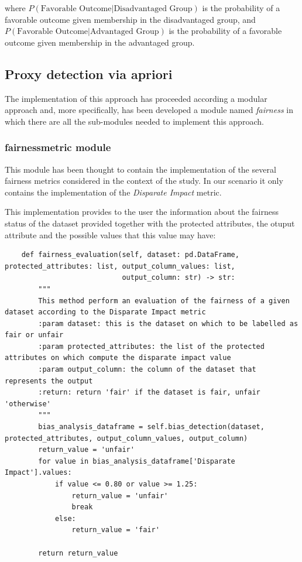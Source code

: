 \documentclass[12pt,a4paper,openright,twoside]{book}
\begin{document}
where $P(\text{Favorable Outcome} | \text{Disadvantaged Group})$ is the probability of a favorable outcome given membership in the disadvantaged group, and  
 $P(\text{Favorable Outcome} | \text{Advantaged Group})$ is the probability of a favorable outcome given membership in the advantaged group.
\subsection{Proxy detection via apriori}
The implementation of this approach has proceeded according a modular approach and, more specifically, has been developed a module named \emph{fairness} in which there are all the sub-modules needed to implement this approach.
\subsubsection{fairness\textunderscore metric module}
This module has been thought to contain the implementation of the several fairness metrics considered in the context of the study. In our scenario it only contains the implementation of the \emph{Disparate Impact} metric. 

This implementation provides to the user the information about the fairness status of the dataset provided together with the protected attributes, the otuput attribute and the possible values that this value may have: 

\begin{lstlisting}
    def fairness_evaluation(self, dataset: pd.DataFrame, protected_attributes: list, output_column_values: list,
                            output_column: str) -> str:
        """
        This method perform an evaluation of the fairness of a given dataset according to the Disparate Impact metric
        :param dataset: this is the dataset on which to be labelled as fair or unfair
        :param protected_attributes: the list of the protected attributes on which compute the disparate impact value
        :param output_column: the column of the dataset that represents the output
        :return: return 'fair' if the dataset is fair, unfair 'otherwise'
        """
        bias_analysis_dataframe = self.bias_detection(dataset, protected_attributes, output_column_values, output_column)
        return_value = 'unfair'
        for value in bias_analysis_dataframe['Disparate Impact'].values:
            if value <= 0.80 or value >= 1.25:
                return_value = 'unfair'
                break
            else:
                return_value = 'fair'

        return return_value
\end{lstlisting}
\end{document}
